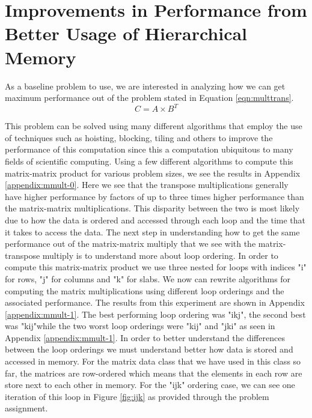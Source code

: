 \documentclass{article}
\begin{document}
\section{Improvements in Performance from Better Usage of Hierarchical Memory}

As a baseline problem to use, we are interested in analyzing how we can get maximum performance out of the problem stated in Equation \ref{eqn:multtrans}. 
\begin{equation}
	\label{eqn:multtrans}
	C = A \times B^T
\end{equation}

This problem can be solved using many different algorithms that employ the use of techniques such as hoisting, blocking, tiling and others to improve the performance of this computation since this a computation ubiquitous to many fields of scientific computing. Using a few different algorithms to compute this matrix-matrix product for various problem sizes, we see the results in Appendix \ref{appendix:mmult-0}. Here we see that the transpose multiplications generally have higher performance by factors of up to three times higher performance than the matrix-matrix multiplications. This disparity between the two is most likely due to how the data is ordered and accessed through each loop and the time that it takes to access the data. The next step in understanding how to get the same performance out of the matrix-matrix multiply that we see with the matrix-transpose multiply is to understand more about loop ordering. In order to compute this matrix-matrix product we use three nested for loops with indices "i" for rows, "j" for columns and "k" for slabs. We now can rewrite algorithms for computing the matrix multiplications using different loop orderings and the associated performance. The results from this experiment are shown in Appendix \ref{appendix:mmult-1}. The best performing loop ordering was "ikj", the second best was "kij"while the two worst loop orderings were "kij" and "jki" as seen in Appendix \ref{appendix:mmult-1}. In order to better understand the differences between the loop orderings we must understand better how data is stored and accessed in memory. For the matrix data class that we have used in this class so far, the matrices are row-ordered which means that the elements in each row are store next to each other in memory. For the "ijk" ordering case, we can see one iteration of this loop in Figure \ref{fig:ijk} as provided through the problem assignment. 
\end{document}
